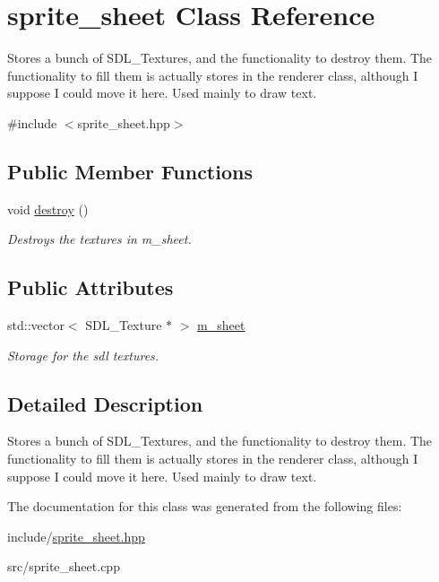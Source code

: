 \hypertarget{structsprite__sheet}{\section{sprite\-\_\-sheet Class Reference}
\label{structsprite__sheet}
}


Stores a bunch of S\-D\-L\-\_\-\-Textures, and the functionality to destroy them. The functionality to fill them is actually stores in the renderer class, although I suppose I could move it here. Used mainly to draw text.  




{\ttfamily \#include $<$sprite\-\_\-sheet.\-hpp$>$}

\subsection*{Public Member Functions}
\begin{DoxyCompactItemize}
\item 
\hypertarget{structsprite__sheet_af199744dfbd8b4efe3d5170f92e8bff3}{void \hyperlink{structsprite__sheet_af199744dfbd8b4efe3d5170f92e8bff3}{destroy} ()}\label{structsprite__sheet_af199744dfbd8b4efe3d5170f92e8bff3}

\begin{DoxyCompactList}\small\item\em Destroys the textures in m\-\_\-sheet. \end{DoxyCompactList}\end{DoxyCompactItemize}
\subsection*{Public Attributes}
\begin{DoxyCompactItemize}
\item 
\hypertarget{structsprite__sheet_a5979f53ad0519486d63e9473a62e08c2}{std\-::vector$<$ S\-D\-L\-\_\-\-Texture $\ast$ $>$ \hyperlink{structsprite__sheet_a5979f53ad0519486d63e9473a62e08c2}{m\-\_\-sheet}}\label{structsprite__sheet_a5979f53ad0519486d63e9473a62e08c2}

\begin{DoxyCompactList}\small\item\em Storage for the sdl textures. \end{DoxyCompactList}\end{DoxyCompactItemize}


\subsection{Detailed Description}
Stores a bunch of S\-D\-L\-\_\-\-Textures, and the functionality to destroy them. The functionality to fill them is actually stores in the renderer class, although I suppose I could move it here. Used mainly to draw text. 

The documentation for this class was generated from the following files\-:\begin{DoxyCompactItemize}
\item 
include/\hyperlink{sprite__sheet_8hpp}{sprite\-\_\-sheet.\-hpp}\item 
src/sprite\-\_\-sheet.\-cpp\end{DoxyCompactItemize}
